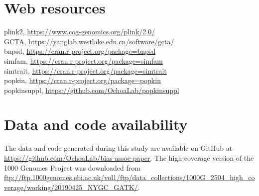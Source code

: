 \documentclass[11pt]{article}
\begin{document}
\section*{Web resources}
plink2, \url{https://www.cog-genomics.org/plink/2.0/}\\
GCTA, \url{https://yanglab.westlake.edu.cn/software/gcta/}\\
bnpsd, \url{https://cran.r-project.org/package=bnpsd}\\
simfam, \url{https://cran.r-project.org/package=simfam}\\
simtrait, \url{https://cran.r-project.org/package=simtrait}\\
popkin, \url{https://cran.r-project.org/package=popkin}\\
popkinsuppl, \url{https://github.com/OchoaLab/popkinsuppl}

\section*{Data and code availability}
The data and code generated during this study are available on GitHub at \url{https://github.com/OchoaLab/bias-assoc-paper}.
The high-coverage version of the 1000 Genomes Project was downloaded from \url{ftp://ftp.1000genomes.ebi.ac.uk/vol1/ftp/data_collections/1000G_2504_high_coverage/working/20190425_NYGC_GATK/}.


\printbibliography
\end{document}
